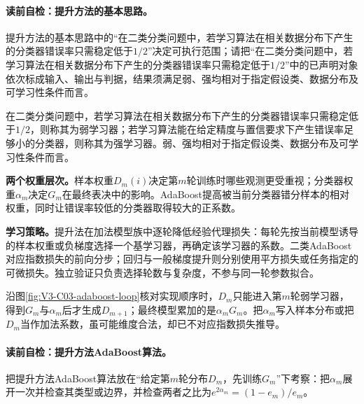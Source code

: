 \paragraph{读前自检：提升方法的基本思路。}提升方法的基本思路中的“在二类分类问题中，若学习算法在相关数据分布下产生的分类器错误率只需稳定低于$1/2$”决定可执行范围；请把“在二类分类问题中，若学习算法在相关数据分布下产生的分类器错误率只需稳定低于$1/2$”中的已声明对象依次标成输入、输出与判据，结果须满足弱、强均相对于指定假设类、数据分布及可学习性条件而言。\par

\label{struct:V3-C03-CH07}
\begin{definition}[弱学习器与强学习器]\label{def:V3-C03-weak-strong}
在二类分类问题中，若学习算法在相关数据分布下产生的分类器错误率只需稳定低于$1/2$，则称其为弱学习器；若学习算法能在给定精度与置信要求下产生错误率足够小的分类器，则称其为强学习器。弱、强均相对于指定假设类、数据分布及可学习性条件而言。
\end{definition}

\label{struct:V3-C03-CH08}
\textbf{两个权重层次。}样本权重$D_m(i)$决定第$m$轮训练时哪些观测更受重视；分类器权重$\alpha_m$决定$G_m$在最终表决中的影响。AdaBoost提高被当前分类器错分样本的相对权重，同时让错误率较低的分类器取得较大的正系数。

\label{struct:V3-C03-CH09}
\textbf{学习策略。}提升法在加法模型族中逐轮降低经验代理损失：每轮先按当前模型诱导的样本权重或负梯度选择一个基学习器，再确定该学习器的系数。二类AdaBoost对应指数损失的前向分步；回归与一般梯度提升则分别使用平方损失或任务指定的可微损失。独立验证只负责选择轮数与复杂度，不参与同一轮参数拟合。


沿图\ref{fig:V3-C03-adaboost-loop}核对实现顺序时，$D_m$只能进入第$m$轮弱学习器，得到$G_m$与$\alpha_m$后才生成$D_{m+1}$；最终模型累加的是$\alpha_mG_m$。把$\alpha_m$写入样本分布或把$D_m$当作加法系数，虽可能维度合法，却已不对应指数损失推导。


\paragraph{读前自检：提升方法AdaBoost算法。}把提升方法AdaBoost算法放在“给定第$m$轮分布$D_m$，先训练$G_m$”下考察：把$\alpha_m$展开一次并检查其类型或边界，并检查两者之比为$e^{2\alpha_m}=(1-e_m)/e_m$。\par

